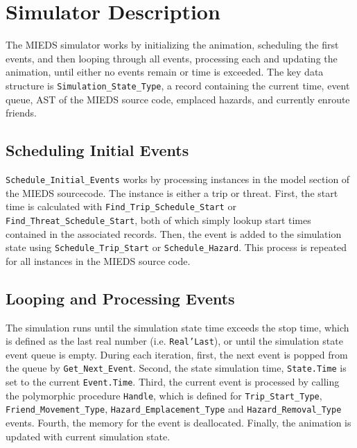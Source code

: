 \documentclass[12pt,letterpaper,titlepage]{article}
\newcommand{\code}[1]{\texttt{#1}}
\newcommand{\mieds}[0]{\textsc{MIEDS}}
\begin{document}

\doublespacing

\section{Simulator Description}

The \mieds{} simulator works by initializing the animation, scheduling
the first events, and then looping through all events, processing each
and updating the animation, until either no events remain or time is
exceeded.  The key data structure is \code{Simulation_State_Type}, a
record containing the current time, event queue, AST of the \mieds{}
source code, emplaced hazards, and currently enroute friends.

\subsection{Scheduling Initial Events}

\code{Schedule_Initial_Events} works by processing instances in the
model section of the \mieds{} sourcecode.  The instance is either a
trip or threat.  First, the start time is calculated with
\code{Find_Trip_Schedule_Start} or \code{Find_Threat_Schedule_Start},
both of which simply lookup start times contained in the associated
records.  Then, the event is added to the simulation state using
\code{Schedule_Trip_Start} or \code{Schedule_Hazard}.  This process is
repeated for all instances in the \mieds{} source code.

\subsection{Looping and Processing Events}

The simulation runs until the simulation state time exceeds the stop
time, which is defined as the last real number
(i.e. \code{Real'Last}), or until the simulation state event queue is
empty.  During each iteration, first, the next event is popped from
the queue by \code{Get_Next_Event}.  Second, the state simulation
time, \code{State.Time} is set to the current \code{Event.Time}.
Third, the current event is processed by calling the polymorphic
procedure \code{Handle}, which is defined for \code{Trip_Start_Type},
\code{Friend_Movement_Type}, \code{Hazard_Emplacement_Type} and
\code{Hazard_Removal_Type} events.  Fourth, the memory for the event
is deallocated.  Finally, the animation is updated with current
simulation state.
\end{document}
